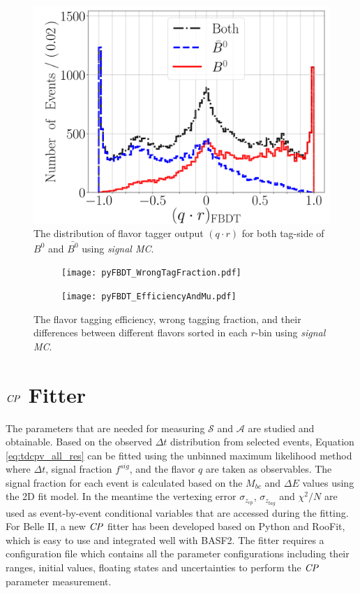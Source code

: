 \begin{figure}[htpb]
 	\centering
 	\includegraphics[width=0.7\linewidth]{figures/qr}
 	\caption{The distribution of flavor tagger output $(q\cdot r)$ for both tag-side of $B^0$ and $\bar{B^0}$ using \textit{signal MC}.}
 	\label{fig:ft_qr}
 	\end{figure}
 
 \begin{figure}[htpb]
 	\begin{subfigure}{0.5\linewidth}
 		\texttt{[image: pyFBDT\_WrongTagFraction.pdf]}
 	\end{subfigure}
 \begin{subfigure}{0.5\linewidth}
 	\texttt{[image: pyFBDT\_EfficiencyAndMu.pdf]}
 \end{subfigure}
 	\caption{The flavor tagging efficiency, wrong tagging fraction, and their differences between different flavors sorted in each $r$-bin using \textit{signal MC}.}
 	\label{fig:ft_wtag}
 \end{figure}

\section{$\it{CP}$ Fitter}

The parameters that are needed for measuring $\mathcal{S}$ and $\mathcal{A}$ are studied and obtainable. Based on the observed $\Delta t$ distribution from selected events, Equation \ref{eq:tdcpv_all_res} can be fitted using the unbinned maximum likelihood method where $\Delta t$, signal fraction $f^{sig}$, and the flavor $q$ are taken as observables. The signal fraction for each event is calculated based on the $M_{bc}$ and $\Delta E$ values using the 2D fit model. In the meantime the vertexing error $\sigma_{z_{cp}}$, $\sigma_{z_{tag}}$ and $\chi^2/N$ are used as event-by-event conditional variables that are accessed during the fitting.
For Belle II, a new $\it{CP}$ fitter has been developed based on Python and RooFit, which is easy to use and integrated well with BASF2. The fitter requires a configuration file which contains all the parameter configurations including their ranges, initial values, floating states and uncertainties to perform the $\it{CP}$ parameter measurement. 

